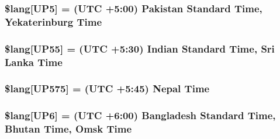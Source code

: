 \subsubsection[{\$lang}]{\setlength{\rightskip}{0pt plus 5cm}\$lang\mbox{[}\textquotesingle{}U\+P5\textquotesingle{}\mbox{]} = \textquotesingle{}(U\+T\+C +5\+:00) Pakistan Standard Time, Yekaterinburg Time\textquotesingle{}}\label{system_2language_2english_2date__lang_8php_a08236ffa5ff4db9f2bc023f5256fead1}
\hypertarget{system_2language_2english_2date__lang_8php_aa55a1ebecdfbd5e0c7e40c921b90cad2}{}
\subsubsection[{\$lang}]{\setlength{\rightskip}{0pt plus 5cm}\$lang\mbox{[}\textquotesingle{}U\+P55\textquotesingle{}\mbox{]} = \textquotesingle{}(U\+T\+C +5\+:30) Indian Standard Time, Sri Lanka Time\textquotesingle{}}\label{system_2language_2english_2date__lang_8php_aa55a1ebecdfbd5e0c7e40c921b90cad2}
\hypertarget{system_2language_2english_2date__lang_8php_abc4186fc3bc853aa036b5b11eeb52ecd}{}
\subsubsection[{\$lang}]{\setlength{\rightskip}{0pt plus 5cm}\$lang\mbox{[}\textquotesingle{}U\+P575\textquotesingle{}\mbox{]} = \textquotesingle{}(U\+T\+C +5\+:45) Nepal Time\textquotesingle{}}\label{system_2language_2english_2date__lang_8php_abc4186fc3bc853aa036b5b11eeb52ecd}
\hypertarget{system_2language_2english_2date__lang_8php_aaa655de76a3be875d9cedbf4a57244fa}{}
\subsubsection[{\$lang}]{\setlength{\rightskip}{0pt plus 5cm}\$lang\mbox{[}\textquotesingle{}U\+P6\textquotesingle{}\mbox{]} = \textquotesingle{}(U\+T\+C +6\+:00) Bangladesh Standard Time, Bhutan Time, Omsk Time\textquotesingle{}}\label{system_2language_2english_2date__lang_8php_aaa655de76a3be875d9cedbf4a57244fa}
\hypertarget{system_2language_2english_2date__lang_8php_af94f885b6e6c50abdf7672ddfa80774d}{}
